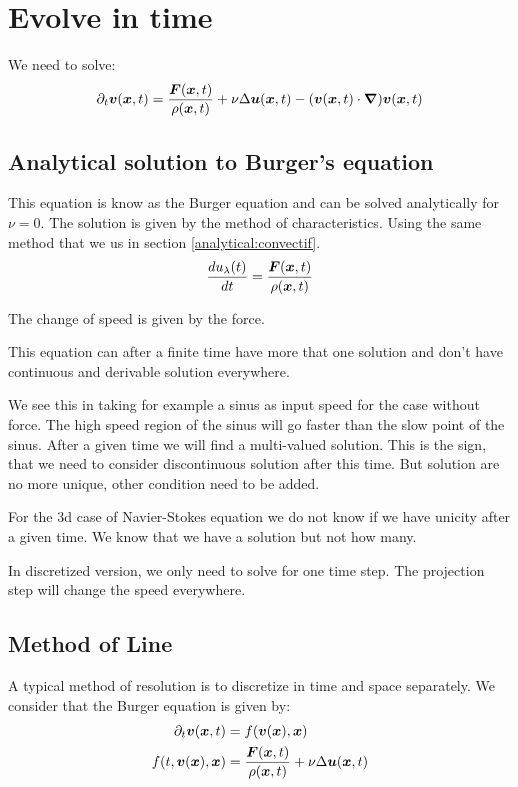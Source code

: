 \section{Evolve in time}

We need to solve:
  \begin{equation}
  \partial_t {\boldsymbol {v}}({\boldsymbol {x}} ,t)=\frac{{\boldsymbol {F}}({\boldsymbol {x}},t)}{\rho({\boldsymbol {x}},t)}+\nu \Delta {\boldsymbol {u}}({\boldsymbol {x}},t)-({\boldsymbol {v}}({\boldsymbol {x}},t)\cdot{\boldsymbol {\nabla}} ) {\boldsymbol {v}}({\boldsymbol {x}} ,t)
  \end{equation}
  
  \subsection{Analytical solution to Burger's equation}
  This equation is know as the Burger equation and can be solved analytically for $\nu=0$.
  The solution is given by the method of characteristics. Using the same method that we us in section \ref{analytical:convectif}.
  \begin{equation}
  \frac{d u_{\lambda}(t)}{dt}=\frac{{\boldsymbol {F}}({\boldsymbol {x}},t)}{\rho({\boldsymbol {x}},t)}
  \end{equation}
  
  The change of speed is given by the force.
  
  This equation can after a finite time have more that one solution and don't have continuous and derivable solution everywhere.
  
  We see this in taking for example a sinus as input speed for the case without force.
  The high speed region of the sinus will go faster than the slow point of the sinus.
  After a given time we will find a multi-valued solution. This is the sign, that we need to consider discontinuous solution after this time.
  But solution are no more unique, other condition need to be added.
  
  For the 3d case of Navier-Stokes equation we do not know if we have unicity after a given time.
  We know that we have a solution but not how many.
  
  In discretized version, we only need to solve for one time step.
  The projection step will change the speed everywhere.

  \subsection{Method of Line}
  
  A typical method of resolution is to discretize in time and space separately.
  We consider that the Burger equation is given by:
  \begin{align}
  \label{fixed:lineA}
  \partial_t {\boldsymbol {v}}({\boldsymbol {x}} ,t)&=f({\boldsymbol {v}}({\boldsymbol {x}}),{\boldsymbol {x}})\\
  \label{fixed:lineB}
  f(t,{\boldsymbol {v}}({\boldsymbol {x}}),{\boldsymbol {x}})&=\frac{{\boldsymbol {F}}({\boldsymbol {x}},t)}{\rho({\boldsymbol {x}},t)}+\nu \Delta {\boldsymbol {u}}({\boldsymbol {x}},t)
  \end{align}
  
